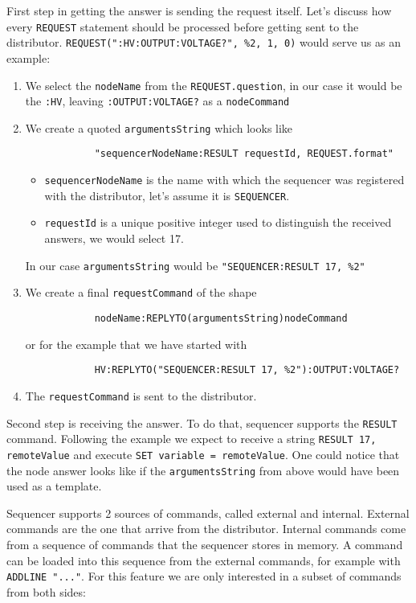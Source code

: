 First step in getting the answer is sending the request itself. Let's discuss how every \texttt{REQUEST} statement should be processed before getting sent to the distributor. \texttt{REQUEST(":HV:OUTPUT:VOLTAGE?", \%2, 1, 0)} would serve us as an example:

\begin{enumerate}
	\item We select the \texttt{nodeName} from the \texttt{REQUEST.question}, in our case it would be the \texttt{:HV}, leaving \texttt{:OUTPUT:VOLTAGE?} as a \texttt{nodeCommand}
	\item{
		We create a quoted \texttt{argumentsString} which looks like 
		\begin{verbatim}
			"sequencerNodeName:RESULT requestId, REQUEST.format"
		\end{verbatim}
		\begin{itemize}
			\item \texttt{sequencerNodeName} is the name with which the sequencer was registered with the distributor, let's assume it is \texttt{SEQUENCER}.
			\item \texttt{requestId} is a unique positive integer used to distinguish the received answers, we would select 17.
		\end{itemize}
		In our case \texttt{argumentsString} would be \texttt{"SEQUENCER:RESULT 17, \%2"}
	}
	\item{
		We create a final \texttt{requestCommand} of the shape
		\begin{verbatim}
			nodeName:REPLYTO(argumentsString)nodeCommand
		\end{verbatim}
		or for the example that we have started with
		\begin{verbatim}
			HV:REPLYTO("SEQUENCER:RESULT 17, %2"):OUTPUT:VOLTAGE?
		\end{verbatim}
	}
	\item The \texttt{requestCommand} is sent to the distributor.
\end{enumerate}

Second step is receiving the answer. To do that, sequencer supports the \texttt{RESULT} command. Following the example we expect to receive a string \texttt{RESULT 17, remoteValue} and execute \texttt{SET variable = remoteValue}. One could notice that the node answer looks like if the \texttt{argumentsString} from above would have been used as a template.

Sequencer supports 2 sources of commands, called external and internal. External commands are the one that arrive from the distributor. Internal commands come from a sequence of commands that the sequencer stores in memory. A command can be loaded into this sequence from the external commands, for example with \texttt{ADDLINE "..."}. For this feature we are only interested in a subset of commands from both sides:

